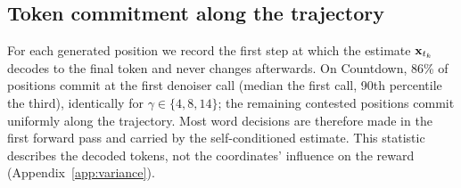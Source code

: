 \subsection{Token commitment along the trajectory}
\label{app:commit}
For each generated position we record the first step at which the estimate ${\mathbf{x}}_{t_k}$ decodes to the final token and never changes afterwards. On Countdown, 86\% of positions commit at the first denoiser call (median the first call, 90th percentile the third), identically for $\gamma\in\{4,8,14\}$; the remaining contested positions commit uniformly along the trajectory. Most word decisions are therefore made in the first forward pass and carried by the self-conditioned estimate. This statistic describes the decoded tokens, not the coordinates' influence on the reward (Appendix~\ref{app:variance}).
